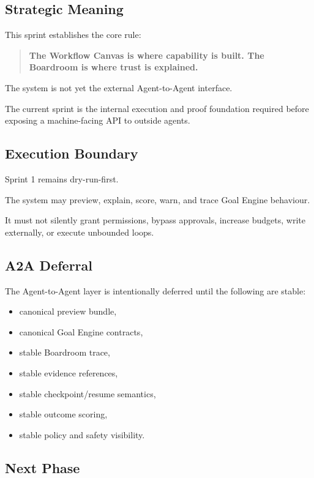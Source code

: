 \subsection{Strategic Meaning}

This sprint establishes the core rule:

\begin{quote}
\textbf{The Workflow Canvas is where capability is built. The Boardroom is where trust is explained.}
\end{quote}

The system is not yet the external Agent-to-Agent interface.

The current sprint is the internal execution and proof foundation required before exposing a machine-facing API to outside agents.

\subsection{Execution Boundary}

Sprint 1 remains dry-run-first.

The system may preview, explain, score, warn, and trace Goal Engine behaviour.

It must not silently grant permissions, bypass approvals, increase budgets, write externally, or execute unbounded loops.

\subsection{A2A Deferral}

The Agent-to-Agent layer is intentionally deferred until the following are stable:

\begin{itemize}
  \item canonical preview bundle,
  \item canonical Goal Engine contracts,
  \item stable Boardroom trace,
  \item stable evidence references,
  \item stable checkpoint/resume semantics,
  \item stable outcome scoring,
  \item stable policy and safety visibility.
\end{itemize}

\subsection{Next Phase}

